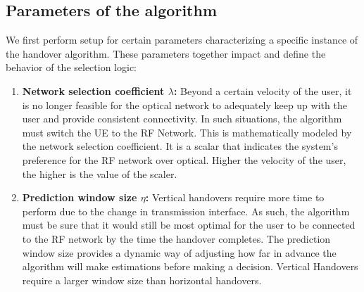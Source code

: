 \subsection{Parameters of the algorithm}
\label{subsubsec:param_init}
We first perform setup for certain parameters characterizing a specific instance of the handover algorithm. These parameters together impact and define the behavior of the selection logic:
\begin{enumerate}
    \item \textbf{Network selection coefficient $\lambda$:} Beyond a certain velocity of the user, it is no longer feasible for the optical network to adequately keep up with the user and provide consistent connectivity. In such situations, the algorithm must switch the UE to the RF Network. This is mathematically modeled by the network selection coefficient. It is a scalar that indicates the system's preference for the RF network over optical. Higher the velocity of the user, the higher is the value of the scaler.
    \item \textbf{Prediction window size $\eta$:} Vertical handovers require more time to perform due to the change in transmission interface. As such, the algorithm must be sure that it would still be most optimal for the user to be connected to the RF network by the time the handover completes. The prediction window size provides a dynamic way of adjusting how far in advance the algorithm will make estimations before making a decision. Vertical Handovers require a larger window size than horizontal handovers. 
\end{enumerate}
